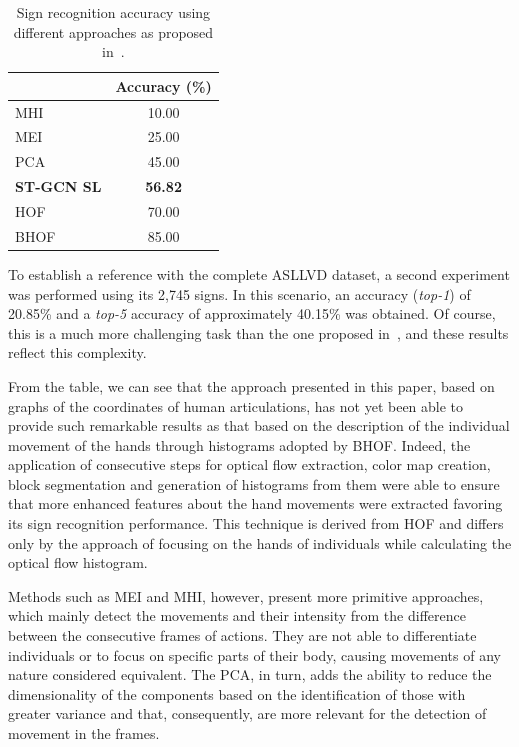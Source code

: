\begin{table}[ht]
\centering
\caption{Sign recognition accuracy using different approaches as proposed in~\cite{lim-2016}.}
\label{tab:results-comparison-20}
\begin{tabular}{lc}
\hline
                   & Accuracy (\%)  \\ \hline
MHI                & 10.00                     \\
MEI                & 25.00                     \\
PCA                & 45.00                     \\
\textbf{ST-GCN SL} & \textbf{56.82}            \\
HOF                & 70.00                     \\
BHOF               & 85.00                     \\ \hline
\end{tabular}
\end{table}

To establish a reference with the complete ASLLVD dataset, a second experiment was performed using its 2,745 signs. In this scenario, an accuracy (\textit{top-1}) of 20.85\% and a \textit{top-5} accuracy of approximately 40.15\% was obtained. Of course, this is a much more challenging task than the one proposed in~\cite{lim-2016}, and these results reflect this complexity.

From the table, we can see that the approach presented in this paper, based on graphs of the coordinates of human articulations, has not yet been able to provide such remarkable results as that based on the description of the individual movement of the hands through histograms adopted by BHOF. Indeed, the application of consecutive steps for optical flow extraction, color map creation, block segmentation and generation of histograms from them were able to ensure that more enhanced features about the hand movements were extracted favoring its sign recognition performance. This technique is derived from HOF and differs only by the approach of focusing on the hands of individuals while calculating the optical flow histogram.

Methods such as MEI and MHI, however, present more primitive approaches, which mainly detect the movements and their intensity from the difference between the consecutive frames of actions. They are not able to differentiate individuals or to focus on specific parts of their body, causing movements of any nature considered equivalent. The PCA, in turn, adds the ability to reduce the dimensionality of the components based on the identification of those with greater variance and that, consequently, are more relevant for the detection of movement in the frames.

